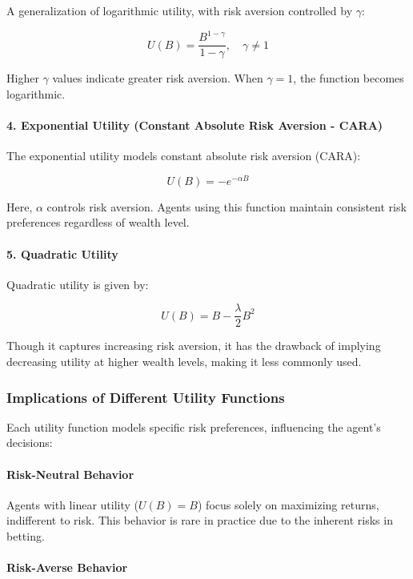 A generalization of logarithmic utility, with risk aversion controlled by \( \gamma \):

\[
U(B) = \frac{B^{1 - \gamma}}{1 - \gamma}, \quad \gamma \neq 1
\]

Higher \( \gamma \) values indicate greater risk aversion. When \( \gamma = 1 \), the function becomes logarithmic.

\paragraph{4. Exponential Utility (Constant Absolute Risk Aversion - CARA)}

The exponential utility models constant absolute risk aversion (CARA):

\[
U(B) = -e^{-\alpha B}
\]

Here, \( \alpha \) controls risk aversion. Agents using this function maintain consistent risk preferences regardless of wealth level.

\paragraph{5. Quadratic Utility}

Quadratic utility is given by:

\[
U(B) = B - \frac{\lambda}{2} B^2
\]

Though it captures increasing risk aversion, it has the drawback of implying decreasing utility at higher wealth levels, making it less commonly used.

\subsubsection{Implications of Different Utility Functions}

Each utility function models specific risk preferences, influencing the agent’s decisions:

\paragraph{Risk-Neutral Behavior}

Agents with linear utility (\( U(B) = B \)) focus solely on maximizing returns, indifferent to risk. This behavior is rare in practice due to the inherent risks in betting.

\paragraph{Risk-Averse Behavior}

